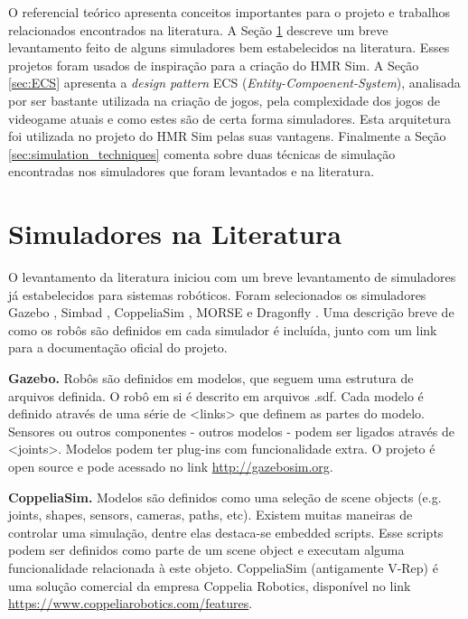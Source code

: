 \label{chapter:referencial}

O referencial teórico apresenta conceitos importantes para o projeto e trabalhos relacionados encontrados na literatura. A Seção \ref{sec:outros_simuladores} descreve um breve levantamento feito de alguns simuladores bem estabelecidos na literatura. Esses projetos foram usados de inspiração para a criação do HMR Sim. A Seção \ref{sec:ECS} apresenta a \textit{design pattern} ECS (\textit{Entity-Compoenent-System}), analisada por ser bastante utilizada na criação de jogos, pela complexidade dos jogos de videogame atuais e como estes são de certa forma simuladores. Esta arquitetura foi utilizada no projeto do HMR Sim pelas suas vantagens. Finalmente a Seção \ref{sec:simulation_techniques} comenta sobre duas técnicas de simulação encontradas nos simuladores que foram levantados e na literatura.

\section{Simuladores na Literatura}
\label{sec:outros_simuladores}

O levantamento da literatura iniciou com um breve levantamento de simuladores já estabelecidos para sistemas robóticos. Foram selecionados os simuladores Gazebo \cite{koenig2004gazebo}, Simbad \cite{hugues2006simbad}, CoppeliaSim \cite{rohmer2013coopeliasim}, MORSE \cite{echeverria2011morse} e Dragonfly \cite{maia2019dragonfly}. Uma descrição breve de como os robôs são definidos em cada simulador é incluída, junto com um link para a documentação oficial do projeto.

\textbf{Gazebo.} Robôs são definidos em modelos, que seguem uma estrutura de arquivos definida. O robô em si é descrito em arquivos .sdf. Cada modelo é definido através de uma série de <links> que definem as partes do modelo. Sensores ou outros componentes - outros modelos - podem ser ligados através de <joints>. Modelos podem ter plug-ins com funcionalidade extra. O projeto é open source e pode acessado no link \url{http://gazebosim.org}. 

\textbf{CoppeliaSim.} Modelos são definidos como uma seleção de scene objects (e.g. joints, shapes, sensors, cameras, paths, etc). Existem muitas maneiras de controlar uma simulação, dentre elas destaca-se embedded scripts. Esse scripts podem ser definidos como parte de um scene object e executam alguma funcionalidade relacionada à este objeto. CoppeliaSim (antigamente V-Rep) é uma solução comercial da empresa Coppelia Robotics, disponível no link \url{https://www.coppeliarobotics.com/features}.

